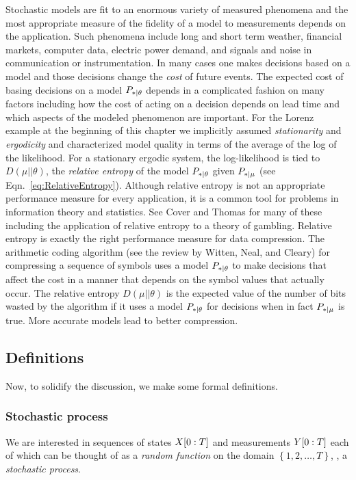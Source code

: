 Stochastic models are fit to an enormous variety of measured phenomena
and the most appropriate measure of the fidelity of a model to
measurements depends on the application.  Such phenomena include long
and short term weather, financial markets, computer data, electric
power demand, and signals and noise in communication or
instrumentation.  In many cases one makes decisions based on a model
and those decisions change the \emph{cost} of future events.  The
expected cost of basing decisions on a model $P_{*\mid \theta}$ depends in
a complicated fashion on many factors including how the cost of acting
on a decision depends on lead time and which aspects of the modeled
phenomenon are important.  For the Lorenz example at the beginning of
this chapter we implicitly assumed \emph{stationarity} and
\emph{ergodicity} and characterized model quality in terms of the
average of the log of the likelihood.  For a stationary ergodic
system, the log-likelihood is tied to $D(\mu||\theta)$, the
\emph{relative entropy} of the model $P_{*\mid \theta}$ given $P_{*\mid \mu}$
(see Eqn.~\eqref{eq:RelativeEntropy}).  Although relative entropy is
not an appropriate performance measure for every application, it is a
common tool for problems in information theory and statistics.  See
Cover and Thomas\cite{Cover91} for many of these including the
application of relative entropy to a theory of gambling.  Relative
entropy is exactly the right performance measure for data compression.
The arithmetic coding algorithm (see the review by Witten, Neal, and
Cleary\cite{Witten87}) for compressing a sequence of symbols uses a
model $P_{*\mid \theta}$ to make decisions that affect the cost in a
manner that depends on the symbol values that actually occur.  The
relative entropy $D(\mu||\theta)$ is the expected value of the number
of bits wasted by the algorithm if it uses a model $P_{*\mid \theta}$ for
decisions when in fact $P_{*\mid \mu}$ is true.  More accurate models lead
to better compression.

\subsection{Definitions}
\label{sec:hDef}

Now, to solidify the discussion, we make some formal definitions.

\subsubsection{Stochastic process}
We are interested in sequences of states $X[0:T]$ and
measurements  $Y[0:T]$ each of which can be thought of as a
\emph{random function} on the domain $\left\{ 1,2,\ldots,T \right\}$,
\ie, a \emph{stochastic process}.

